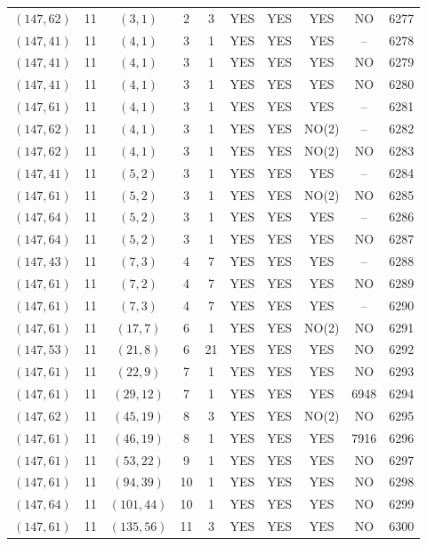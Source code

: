 \begin{longtable}{|c|c|c|c|c|c|c|c|c|c|}
$(147, 62)$ & 11 & $(3, 1)$ & 2 & 3 & YES & YES & YES & NO & 6277\\
$(147, 41)$ & 11 & $(4, 1)$ & 3 & 1 & YES & YES & YES & -- & 6278\\
$(147, 41)$ & 11 & $(4, 1)$ & 3 & 1 & YES & YES & YES & NO & 6279\\
$(147, 41)$ & 11 & $(4, 1)$ & 3 & 1 & YES & YES & YES & NO & 6280\\
$(147, 61)$ & 11 & $(4, 1)$ & 3 & 1 & YES & YES & YES & -- & 6281\\
$(147, 62)$ & 11 & $(4, 1)$ & 3 & 1 & YES & YES & NO(2) & -- & 6282\\
$(147, 62)$ & 11 & $(4, 1)$ & 3 & 1 & YES & YES & NO(2) & NO & 6283\\
$(147, 41)$ & 11 & $(5, 2)$ & 3 & 1 & YES & YES & YES & -- & 6284\\
$(147, 61)$ & 11 & $(5, 2)$ & 3 & 1 & YES & YES & NO(2) & NO & 6285\\
$(147, 64)$ & 11 & $(5, 2)$ & 3 & 1 & YES & YES & YES & -- & 6286\\
$(147, 64)$ & 11 & $(5, 2)$ & 3 & 1 & YES & YES & YES & NO & 6287\\
$(147, 43)$ & 11 & $(7, 3)$ & 4 & 7 & YES & YES & YES & -- & 6288\\
$(147, 61)$ & 11 & $(7, 2)$ & 4 & 7 & YES & YES & YES & NO & 6289\\
$(147, 61)$ & 11 & $(7, 3)$ & 4 & 7 & YES & YES & YES & -- & 6290\\
$(147, 61)$ & 11 & $(17, 7)$ & 6 & 1 & YES & YES & NO(2) & NO & 6291\\
$(147, 53)$ & 11 & $(21, 8)$ & 6 & 21 & YES & YES & YES & NO & 6292\\
$(147, 61)$ & 11 & $(22, 9)$ & 7 & 1 & YES & YES & YES & NO & 6293\\
$(147, 61)$ & 11 & $(29, 12)$ & 7 & 1 & YES & YES & YES & 6948 & 6294\\
$(147, 62)$ & 11 & $(45, 19)$ & 8 & 3 & YES & YES & NO(2) & NO & 6295\\
$(147, 61)$ & 11 & $(46, 19)$ & 8 & 1 & YES & YES & YES & 7916 & 6296\\
$(147, 61)$ & 11 & $(53, 22)$ & 9 & 1 & YES & YES & YES & NO & 6297\\
$(147, 61)$ & 11 & $(94, 39)$ & 10 & 1 & YES & YES & YES & NO & 6298\\
$(147, 64)$ & 11 & $(101, 44)$ & 10 & 1 & YES & YES & YES & NO & 6299\\
$(147, 61)$ & 11 & $(135, 56)$ & 11 & 3 & YES & YES & YES & NO & 6300\\

\end{longtable}
